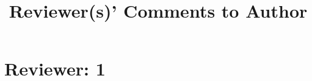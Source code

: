 \documentclass[11pt]{article}
\title{Reviewer(s)' Comments to Author}
\begin{document}
\maketitle



\section{Reviewer: 1}
\end{document}
